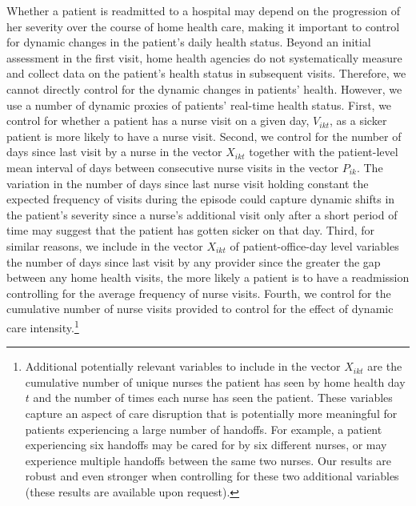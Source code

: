 \documentclass[final,12pt, notitlepage]{article}
\begin{document}
Whether a patient is readmitted to a hospital may depend on the progression of her severity over the course of home health care, making it important to control for dynamic changes in the patient's daily health status.
Beyond an initial assessment in the first visit, home health agencies do not systematically measure and collect data on the patient's health status in subsequent visits.
Therefore, we cannot directly control for the dynamic changes in patients' health.
However, we use a number of dynamic proxies of patients' real-time health status.
First, we control for whether a patient has a nurse visit on a given day, $V_{ikt}$, as a sicker patient is more likely to have a nurse visit.
Second, we control for the number of days since last visit by a nurse in the vector $X_{ikt}$ together with the patient-level mean interval of days between consecutive nurse visits in the vector $P_{ik}$. The variation in the number of days since last nurse visit holding constant the expected frequency of visits during the episode could capture dynamic shifts in the patient's severity since a nurse's additional visit only after a short period of time may suggest that the patient has gotten sicker on that day. Third, for similar reasons, we include in the vector $X_{ikt}$ of patient-office-day level variables the number of days since last visit by any provider since the greater the gap between any home health visits, the more likely a patient is to have a readmission controlling for the average frequency of nurse visits.  Fourth, we control for the cumulative number of nurse visits provided to control for the effect of dynamic care intensity.\footnote{Additional potentially relevant variables to include in the vector $X_{ikt}$ are the cumulative number of unique nurses the patient has seen by home health day $t$ and the number of times each nurse has seen the patient. These variables capture an aspect of care disruption that is potentially more meaningful for patients experiencing a large number of handoffs. For example, a patient experiencing six handoffs may be cared for by six different nurses, or may experience multiple handoffs between the same two nurses. Our results are robust and even stronger when controlling for these two additional variables (these results are available upon request).}
\end{document}
